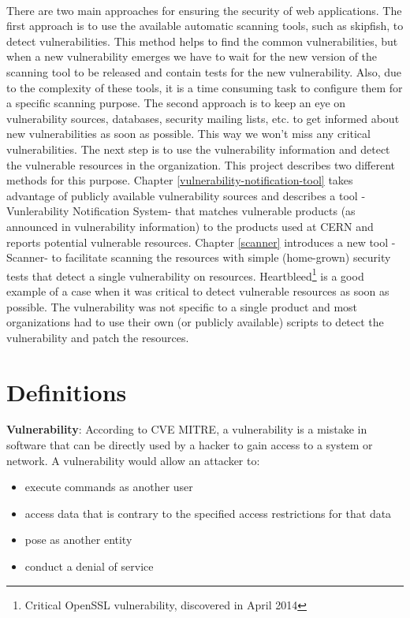 \paragraph{}
There are two main approaches for ensuring the security of web applications. The first approach is to use the available automatic scanning tools, such as skipfish, to detect vulnerabilities. This method helps to find the common vulnerabilities, but when a new vulnerability emerges we have to wait for the new version of the scanning tool to be released and contain tests for the new vulnerability. Also, due to the complexity of these tools, it is a time consuming task to configure them for a specific scanning purpose. 
The second approach is to keep an eye on vulnerability sources, databases, security mailing lists, etc. to get informed about new vulnerabilities as soon as possible. This way we won't miss any critical vulnerabilities. The next step is to use the vulnerability information and detect the vulnerable resources in the organization. This project describes two different methods for this purpose. Chapter \ref{vulnerability-notification-tool} takes advantage of publicly available vulnerability sources and describes a tool -Vunlerability Notification System- that matches  vulnerable products (as announced in vulnerability information) to the products used at CERN and reports potential vulnerable resources. Chapter \ref{scanner} introduces a new tool -Scanner- to facilitate scanning the resources with simple (home-grown) security tests that detect a single vulnerability on resources. Heartbleed\footnote{Critical OpenSSL vulnerability, discovered in April 2014} is a good example of a case when it was critical to detect vulnerable resources as soon as possible. The vulnerability was not specific to a single product and most organizations had to use their own (or publicly available) scripts to detect the vulnerability and patch the resources.

\section{Definitions}
\textbf{Vulnerability}: According to CVE MITRE, a vulnerability is a mistake in software that can be directly used by a hacker to gain access to a system or network. A vulnerability would allow an attacker to:
\begin{itemize}
\item execute commands as another user
\item access data that is contrary to the specified access restrictions for that data
\item pose as another entity
\item conduct a denial of service
\end{itemize}

